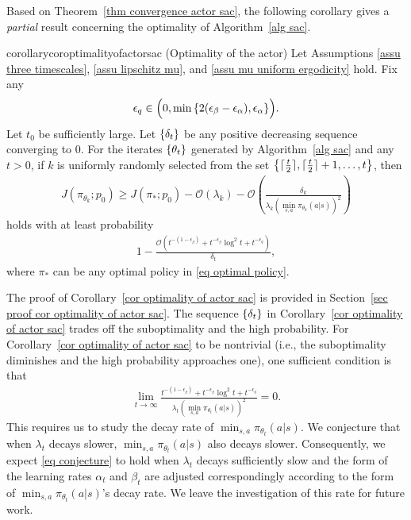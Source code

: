 \documentclass[twoside,11pt]{article}
\DeclarePairedDelimiter{\ceil}{\lceil}{\rceil}
\newcommand{\fO}{\mathcal{O}}
\numberwithin{assucounter}{section}
\begin{document}
Based on Theorem~\ref{thm convergence actor sac},
the following corollary gives a \emph{partial} result concerning the optimality of Algorithm~\ref{alg sac}. 
\begin{restatable}{corollary}{coroptimalityofactorsac}
  \label{cor optimality of actor sac}
  (Optimality of the actor)
  Let Assumptions \ref{assu three timescales}, \ref{assu lipschitz mu}, and \ref{assu mu uniform ergodicity} hold.
  Fix any 
  \begin{align}
    \epsilon_q \in \Big(0, \min\qty{2(\epsilon_\beta - \epsilon_\alpha), \epsilon_\alpha}\Big).
  \end{align}
  Let $t_0$ be sufficiently large.
  Let $\qty{\delta_t}$ be any positive decreasing sequence converging to 0.
  For the iterates $\qty{\theta_t}$ generated by Algorithm~\ref{alg sac} and any $t > 0$,
  if $k$ is uniformly randomly selected from the set $\qty{\ceil{\frac{t}{2}}, \ceil{\frac{t}{2}} + 1, \dots, t}$,
  then
  \begin{align}
    J(\pi_{\theta_k}; p_0) \geq J(\pi_*; p_0) - \fO\left(\lambda_k\right) - \fO\left(\frac{\delta_k}{\lambda_k \left(\min_{s, a} \pi_{\theta_k}(a|s)\right)^2}\right)
  \end{align}
  holds with at least probability
  \begin{align}
    1 - \frac{\fO\left(t^{-(1-\epsilon_\beta)} + t^{-\epsilon_\beta} \log^2t + t^{-\epsilon_q}\right)}{\delta_t},
  \end{align}
  where $\pi_*$ can be any optimal policy in \eqref{eq optimal policy}. 
\end{restatable}
\noindent The proof of Corollary~\ref{cor optimality of actor sac} is provided in Section~\ref{sec proof cor optimality of actor sac}.
The sequence $\qty{\delta_t}$ in Corollary~\ref{cor optimality of actor sac} trades off the suboptimality and the high probability.
For Corollary~\ref{cor optimality of actor sac} to be nontrivial 
(i.e., the suboptimality diminishes and the high probability approaches one),
one sufficient condition is that
\begin{align}
  \label{eq conjecture}
  \lim_{t\to\infty} \frac{t^{-(1-\epsilon_\beta)} + t^{-\epsilon_\beta} \log^2t + t^{-\epsilon_q}}{\lambda_t \left(\min_{s, a} \pi_{\theta_t}(a|s)\right)^2} = 0.
\end{align}
This requires us to study the decay rate of $\min_{s, a}\pi_{\theta_t}(a|s)$.
We conjecture that when $\lambda_t$ decays slower,
$\min_{s, a}\pi_{\theta_t}(a|s)$ also decays slower.
Consequently, we expect \eqref{eq conjecture} to hold when $\lambda_t$ decays sufficiently slow and the form of the learning rates $\alpha_t$ and $\beta_t$ are adjusted correspondingly according to the form of $\min_{s, a}\pi_{\theta_t}(a|s)$'s decay rate.
We leave the investigation of this rate for future work.
\end{document}
